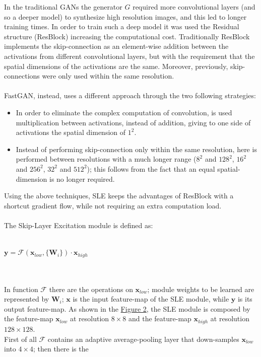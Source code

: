 \documentclass[12pt]{article}
\begin{document}
In the traditional GANs the generator $G$ required more convolutional layers (and so a deeper model) to synthesize 
high resolution images, and this led to longer training times. 
In order to train such a deep model it was used the Residual structure (ResBlock) increasing the computational cost.
Traditionally ResBlock implements the skip-connection as an element-wise addition between the activations from different
convolutional layers, but with the requirement that the spatial dimensions of the activations are the same.
Moreover, previously, skip-connections were only used within the same resolution.\\\\
FastGAN, instead, uses a different approach through the two following strategies:
\begin{itemize}
	\setlength\itemsep{0.01em}
	\item {	
	In order to eliminate the complex computation of convolution, is used multiplication between activations, instead of 
	addition, giving to one side of activations the spatial dimension of $1^2$.
	}
	\item {
	Instead of performing skip-connection only within the same resolution, here is performed between resolutions with a much
	longer range ($8^2$ and $128^2$, $16^2$ and $256^2$, $32^2$ and $512^2$); this follows from the fact that an equal spatial-dimension
	is no longer required.
	}
\end{itemize} 
Using the above techniques, SLE keeps the advantages of ResBlock with a shortcut gradient flow, while not requiring an extra computation
load.\\\\
The Skip-Layer Excitation module is defined as:\\\\
\centerline{$\mathbf{y} = \mathcal{F}(\mathbf{x}_{low}, \{\mathbf{W}_i\})\cdot \mathbf{x}_{high}$}\\\\
In function $\mathcal{F}$ there are the operations on $\mathbf{x}_{low}$; module weights to be learned are represented by $\mathbf{W}_i$; 
$\mathbf{x}$ is the input feature-map of the SLE module, while $\mathbf{y}$ is its output feature-map.
As shown in the \hyperref[fig:fig2]{Figure 2}, the SLE module is composed by the feature-map $\mathbf{x}_{low}$ at resolution $8 \times 8$ and
the feature-map $\mathbf{x}_{high}$ at resolution $128 \times 128$.\\
First of all $\mathcal{F}$ contains an adaptive average-pooling layer that down-samples $\mathbf{x}_{low}$ into $4 \times 4$; then there is the
\end{document}
